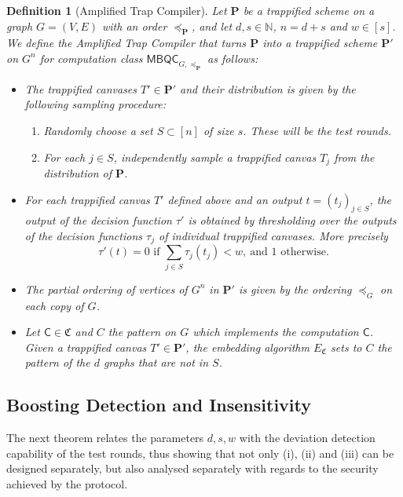 \documentclass[12pt]{iopart}
\newcommand{\cptp}[1]{\mathsf{#1}} \newcommand{\pd}[1]{\mathcal{#1}}  \newcommand{\sch}[1]{\bm{#1}}
\renewcommand{\1}{\mathds{1}}
\newtheorem{definition}{Definition}
\begin{document}
\begin{definition}[Amplified Trap Compiler]\label{def:rvbqc_compiler}
Let $\sch P$ be a trappified scheme on a graph $G = (V, E)$ with an order $\preceq_{\sch P}$, and let $d,s\in \mathbb{N}$, $n = d + s$ and $w \in [s]$. We define the Amplified Trap Compiler that turns $\sch P$ into a trappified scheme $\sch P'$ on $G^n$ for computation class $\mathsf{MBQC}_{G, \preceq_{\sch P}}$ as follows:

\begin{itemize}
	\item The trappified canvases $T' \in \sch P'$ and their distribution is given by the following sampling procedure:
	\begin{enumerate}
		\item Randomly choose a set $S \subset [n]$ of size $s$. These will be the test rounds.
		\item For each $j \in S$, independently sample a trappified canvas $T_j$ from the distribution of $\sch P$.
	\end{enumerate}
	\item For each trappified canvas $T'$ defined above and an output $t = (t_{j})_{j \in S}$, the output of the decision function $\tau'$ is obtained by thresholding over the outputs of the decision functions $\tau_j$ of individual trappified canvases. More precisely
	\begin{equation}
		\tau'(t) = 
0 \text{ if } \sum_{j \in S} \tau_{j}(t_j) < w, \ \text{and } 1 \text{ otherwise}.
\end{equation}
	\item The partial ordering of vertices of $G^n$ in $\sch P'$ is given by the ordering $\preceq_G$ on each copy of $G$.
	\item Let $\cptp C \in \mathfrak{C}$ and $C$ the pattern on $G$ which implements the computation $\cptp C$. Given a trappified canvas $T' \in \sch P'$, the embedding algorithm $E_\mathfrak{C}$ sets to $C$ the pattern of the $d$ graphs that are not in $S$.
\end{itemize}
\end{definition}

\subsection{Boosting Detection and Insensitivity}
The next theorem relates the parameters $d, s, w$ with the deviation detection capability of the test rounds, thus showing that not only (i), (ii) and (iii) can be designed separately, but also analysed separately with regards to the security achieved by the protocol.
\end{document}
